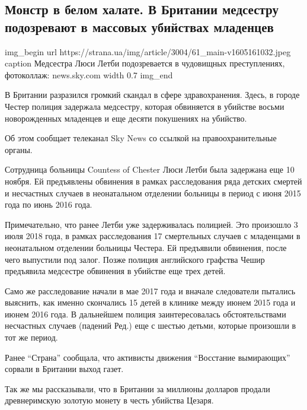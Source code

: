  
 
 

\subsection{Монстр в белом халате. В Британии медсестру подозревают в массовых убийствах младенцев}
\label{sec:12_11_2020.news.ua.strana.1.anglia_lusy_letbi}

\ifcmt
img_begin 
	url https://strana.ua/img/article/3004/61_main-v1605161032.jpeg
	caption Медсестра Люси Летби подозревается в чудовищных преступлениях, фотоколлаж: news.sky.com 
	width 0.7
img_end
\fi

В Британии разразился громкий скандал в сфере здравохранения. Здесь, в городе
Честер полиция задержала медсестру, которая обвиняется в убийстве восьми
новорожденных младенцев и еще десяти покушениях на убийство.

Об этом сообщает телеканал Sky News со ссылкой на правоохранительные органы.

Сотрудница больницы Countess of Chester Люси Летби была задержана еще 10
ноября. Ей предъявлены обвинения в рамках расследования ряда детских смертей и
несчастных случаев в неонатальном отделении больницы в период с июня 2015 года
по июнь 2016 года.

Примечательно, что ранее Летби уже задерживалась полицией. Это произошло 3 июля
2018 года, в рамках расследования 17 смертельных случаев с младенцами в
неонатальном отделении больницы Честера. Ей предъявили обвинения, после чего
выпустили под залог. Позже полиция английского графства Чешир предъявила
медсестре обвинения в убийстве еще трех детей.

Само же расследование начали в мае 2017 года и вначале следователи пытались
выяснить, как именно скончались 15 детей в клинике между июнем 2015 года и
июнем 2016 года. В дальнейшем полиция заинтересовалась обстоятельствами
несчастных случаев (падений \dshM Ред.) еще с шестью детьми, которые произошли в
тот же период.

Ранее \enquote{Страна} сообщала, что активисты движения \enquote{Восстание вымирающих} сорвали
в Британии выход газет.

Так же мы рассказывали, что в Британии за миллионы долларов продали
древнеримскую золотую монету в честь убийства Цезаря.

